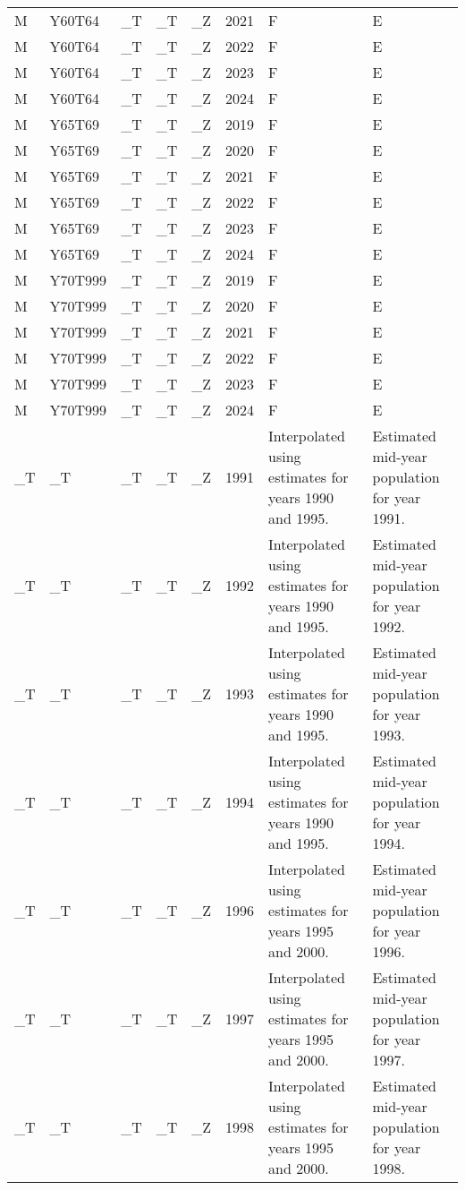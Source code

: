 \begin{longtable}[t]{llllllll}
M & Y60T64 & \_T & \_T & \_Z & 2021 & F & E\\
M & Y60T64 & \_T & \_T & \_Z & 2022 & F & E\\
M & Y60T64 & \_T & \_T & \_Z & 2023 & F & E\\
M & Y60T64 & \_T & \_T & \_Z & 2024 & F & E\\
\addlinespace
M & Y65T69 & \_T & \_T & \_Z & 2019 & F & E\\
M & Y65T69 & \_T & \_T & \_Z & 2020 & F & E\\
M & Y65T69 & \_T & \_T & \_Z & 2021 & F & E\\
M & Y65T69 & \_T & \_T & \_Z & 2022 & F & E\\
M & Y65T69 & \_T & \_T & \_Z & 2023 & F & E\\
\addlinespace
M & Y65T69 & \_T & \_T & \_Z & 2024 & F & E\\
M & Y70T999 & \_T & \_T & \_Z & 2019 & F & E\\
M & Y70T999 & \_T & \_T & \_Z & 2020 & F & E\\
M & Y70T999 & \_T & \_T & \_Z & 2021 & F & E\\
M & Y70T999 & \_T & \_T & \_Z & 2022 & F & E\\
\addlinespace
M & Y70T999 & \_T & \_T & \_Z & 2023 & F & E\\
M & Y70T999 & \_T & \_T & \_Z & 2024 & F & E\\
\_T & \_T & \_T & \_T & \_Z & 1991 & Interpolated using estimates for years 1990 and 1995. & Estimated mid-year population for year 1991.\\
\_T & \_T & \_T & \_T & \_Z & 1992 & Interpolated using estimates for years 1990 and 1995. & Estimated mid-year population for year 1992.\\
\_T & \_T & \_T & \_T & \_Z & 1993 & Interpolated using estimates for years 1990 and 1995. & Estimated mid-year population for year 1993.\\
\addlinespace
\_T & \_T & \_T & \_T & \_Z & 1994 & Interpolated using estimates for years 1990 and 1995. & Estimated mid-year population for year 1994.\\
\_T & \_T & \_T & \_T & \_Z & 1996 & Interpolated using estimates for years 1995 and 2000. & Estimated mid-year population for year 1996.\\
\_T & \_T & \_T & \_T & \_Z & 1997 & Interpolated using estimates for years 1995 and 2000. & Estimated mid-year population for year 1997.\\
\_T & \_T & \_T & \_T & \_Z & 1998 & Interpolated using estimates for years 1995 and 2000. & Estimated mid-year population for year 1998.\\

\end{longtable}
